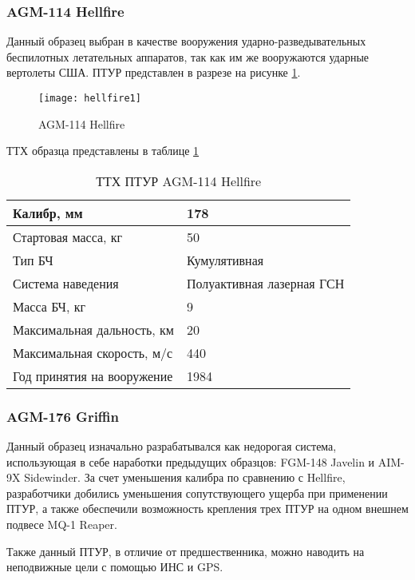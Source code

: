 \subsubsection{AGM-114 Hellfire}
Данный образец выбран в качестве вооружения ударно-разведывательных беспилотных летательных аппаратов, так как им же вооружаются ударные вертолеты США.
ПТУР представлен в разрезе на рисунке \ref{fig:hellfire1}.
\begin{figure}[!h]
\begin{center}
	\texttt{[image: hellfire1]}
	\caption{AGM-114 Hellfire}
	\label{fig:hellfire1}
\end{center}
\end{figure}
ТТХ образца представлены в таблице \ref{tab:hellfire_stats}
\begin{table}[!h]
	\begin{center}
		\caption{ТТХ ПТУР AGM-114 Hellfire}
		\begin{tabular}{|l|l|}
  		\hline
		Калибр, мм & 178 \\ \hline
		Стартовая масса, кг	& 50 \\ \hline
		Тип БЧ	& Кумулятивная \\ \hline
		Система наведения & Полуактивная лазерная ГСН \\ \hline
		Масса БЧ, кг & 9 \\ \hline
		Максимальная дальность, км & 20 \\ \hline
		Максимальная скорость, м/с & 440 \\ \hline
		Год принятия на вооружение & 1984 \\ \hline
		\end{tabular}
		\label{tab:hellfire_stats}
	\end{center}
\end{table}

\subsubsection{AGM-176 Griffin}
Данный образец изначально разрабатывался как недорогая система, использующая в себе наработки предыдущих образцов: FGM-148 Javelin и AIM-9X Sidewinder. За счет уменьшения калибра по сравнению с Hellfire, разработчики добились уменьшения сопутствующего ущерба при применении ПТУР, а также обеспечили возможность крепления трех ПТУР на одном внешнем подвесе MQ-1 Reaper.

Также данный ПТУР, в отличие от предшественника, можно наводить на неподвижные цели с помощью ИНС и GPS.

